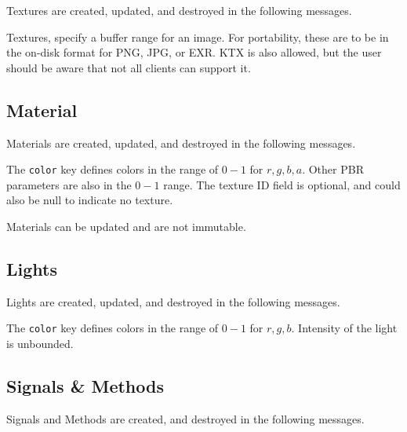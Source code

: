 \documentclass[11pt, oneside]{amsart}
\begin{document}
Textures are created, updated, and destroyed in the following messages.



Textures, specify a buffer range for an image. For portability, these are to be in the on-disk format for PNG, JPG, or EXR. KTX is also allowed, but the user should be aware that not all clients can support it.

\subsection{Material}

Materials are created, updated, and destroyed in the following messages.



The \texttt{color} key defines colors in the range of $0 - 1$ for $r,g,b,a$. Other PBR parameters are also in the $0 - 1$ range. The texture ID field is optional, and could also be null to indicate no texture.

Materials can be updated and are not immutable.

\subsection{Lights}

 Lights are created, updated, and destroyed in the following messages.

 

 The \texttt{color} key defines colors in the range of $0 - 1$ for $r,g,b$. Intensity of the light is unbounded.


\subsection{Signals \& Methods}

Signals and Methods are created, and destroyed in the following messages.


\end{document}

